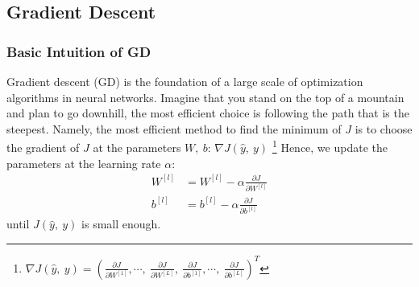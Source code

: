 \subsection{Gradient Descent}
\label{ssec:GD}
\subsubsection{Basic Intuition of GD}
Gradient descent (GD) is the foundation of a large scale of optimization algorithms
in neural networks. Imagine that you stand on the top of a mountain and
plan to go downhill, the most efficient choice is following the path that is the
steepest. Namely, the most efficient method to find the minimum of $ J $ is to
choose the gradient of $ J $ at the parameters $ W,\ b $: 
$ \nabla J(\hat{y},\ y) $ \footnote{$\nabla J(\hat{y},\ y) = 
(\frac{\partial J}{\partial W^{[1]}},\cdots,\ \frac{\partial J}{\partial W^{[L]}},\
\frac{\partial J}{\partial b^{[1]}},\cdots,\ \frac{\partial J}{\partial b^{[L]}} )^T $}
Hence, we update the parameters at the learning rate $ \alpha $:
\begin{align}
    \label{equ:GD} W^{[l]} & = W^{[l]} - \alpha\frac{\partial J}{\partial W^{[l]}} \\
    b^{[l]} & = b^{[l]} - \alpha\frac{\partial J}{\partial b^{[l]}}
\end{align}
until $ J(\hat{y},\ y) $ is small enough.

